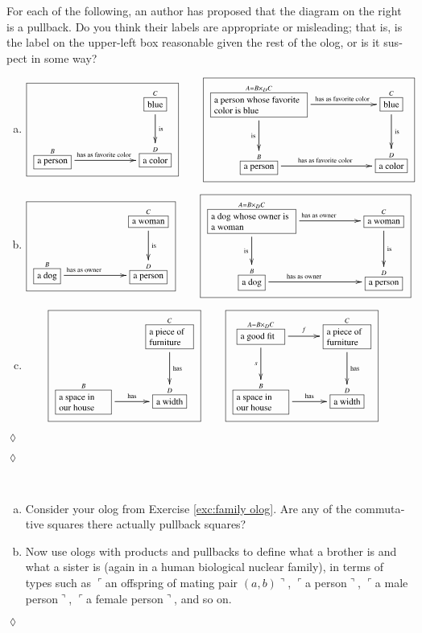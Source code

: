 \documentclass[a4paper]{book}
\def\tn{\textnormal}
\def\hsp{\hspace{.3in}}
\def\rr{\raggedright}
\newcommand{\LA}[2]{\ar[#1]^-{\tn {#2}}}
\newcommand{\LAL}[2]{\ar[#1]_-{\tn {#2}}}
\newcommand{\obox}[3]{\stackrel{#1}{\fbox{\parbox{#2}{#3}}}}
\newcommand{\smbox}[2]{\stackrel{#1}{\fbox{#2}}}
\newcommand{\fakebox}[1]{\tn{$\ulcorner$#1$\urcorner$}}
\theoremstyle{myth}
\newtheorem{excENG}[envENG]{\begin{english}Exercise\end{english}}
\newenvironment{exerciseENG}{\begin{excENG}}{\hspace*{\fill}$\lozenge$\end{excENG}}
\newtheorem{excRUS}[envRUS]{\begin{russian}Упражнение\end{russian}}
\newenvironment{exerciseRUS}{\begin{excRUS}}{\hspace*{\fill}$\lozenge$\end{excRUS}}
\def\sexc{\begin{enumerate}[a.)]\setlength{\itemsep}{.1cm}\setlength{\parskip}{.1cm}\item}
\def\next{\item}
\def\endsexc{\end{enumerate}}
\begin{document}
\begin{english}
\begin{exerciseENG}
For each of the following, an author has proposed that the diagram on the right is a pullback. Do you think their labels are appropriate or misleading; that is, is the label on the upper-left box reasonable given the rest of the olog, or is it suspect in some way?
\sexc\begin{align*}\footnotesize\fbox{\xymatrix{&&\smbox{C}{blue}\LA{d}{is}\\\smbox{B}{a person}\LA{rr}{\parbox{.7in}{\rr has as favorite color}}&&\smbox{D}{a color}}}\hsp&\footnotesize\fbox{\xymatrixnocompile{\obox{A=B\times_DC}{1.1in}{\rr a person whose favorite color is blue}\LAL{d}{is}\LA{rr}{\parbox{.7in}{\rr has as favorite color}}&&\smbox{C}{blue}\LA{d}{is}\\\smbox{B}{a person}\LA{rr}{\parbox{.7in}{\rr has as favorite color}}&&\smbox{D}{a color}}}
\end{align*}
\next\begin{align*}\footnotesize\fbox{\xymatrixnocompile{&&\smbox{C}{a woman}\LA{d}{is}\\\smbox{B}{a dog}\LA{rr}{\parbox{.7in}{\rr has as owner}}&&\smbox{D}{a person}}}\hsp&\footnotesize\fbox{\xymatrixnocompile{\obox{A=B\times_DC}{1in}{\rr a dog whose owner is a woman}\LAL{d}{is}\LA{rr}{\parbox{.7in}{\rr has as owner}}&&\smbox{C}{a woman}\LA{d}{is}\\\smbox{B}{a dog}\LA{rr}{\parbox{.7in}{\rr has as owner}}&&\smbox{D}{a person}}}
\end{align*}
\next\begin{align*}\footnotesize\fbox{\xymatrixnocompile{&\obox{C}{.5in}{\rr a piece of furniture}\LA{d}{has}\\\obox{B}{.6in}{\rr a space in our house}\LA{r}{has}&\smbox{D}{a width}}}\hsp&\footnotesize\fbox{\xymatrixnocompile{\obox{A=B\times_DC}{.5in}{\rr a good fit}\LAL{d}{$s$}\LA{r}{$f$}&\obox{C}{.5in}{\rr a piece of furniture}\LA{d}{has}\\\obox{B}{.6in}{\rr a space in our house}\LA{r}{has}&\smbox{D}{a width}}}
\end{align*}
\endsexc
\end{exerciseENG}

\begin{exerciseRUS}
\begin{russian} \end{russian}
\end{exerciseRUS}

\begin{exerciseENG}~
\sexc Consider your olog from Exercise \ref{exc:family olog}. Are any of the commutative squares there actually pullback squares? 
\next Now use ologs with products and pullbacks to define what a brother is and what a sister is (again in a human biological nuclear family), in terms of types such as \fakebox{an offspring of mating pair $(a,b)$}, \fakebox{a person}, \fakebox{a male person}, \fakebox{a female person}, and so on.
\endsexc
\end{exerciseENG}


\end{english}
\end{document}
